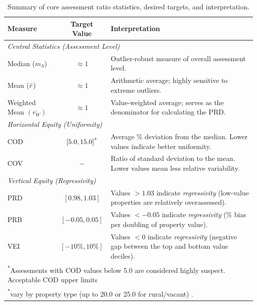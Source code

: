 \documentclass[12pt, draft]{article}
\theoremstyle{plain}
\theoremstyle{definition}
\newcommand{\1}{\mathbf{1}}
\begin{document}
\begin{table}[!ht]
\centering
\caption{Summary of core assessment ratio statistics, desired targets, and interpretation.}
\label{tab:assessment_metrics_summary}
\begin{tabular}{lcp{8.5cm}}
\toprule
\textbf{Measure} & \textbf{Target Value} & \textbf{Interpretation} \\
\midrule
\multicolumn{3}{l}{\textit{{Central Statistics (Assessment Level)}}} \vspace{3mm} \\
Median ($m_S$) & \(\approx 1\) & Outlier-robust measure of overall assessment level. \\
Mean ($\Bar r$) & \(\approx 1\) & Arithmetic average; highly sensitive to extreme outliers. \\
Weighted Mean $(\overline{r_W})$ & \(\approx 1\) & Value-weighted average; serves as the denominator for calculating the PRD. \\
\midrule
\multicolumn{3}{l}{\textit{{Horizontal Equity (Uniformity)}}} \vspace{3mm}\\
COD & \([5.0, 15.0]\textsuperscript{*}\) & Average \% deviation from the median. Lower values indicate better uniformity. \\
COV & $-$ & Ratio of standard deviation to the mean. Lower values mean less relative variability. \\
\midrule
\multicolumn{3}{l}{\textit{{Vertical Equity (Regressivity)}}} \vspace{3mm}\\
PRD & \([0.98, 1.03]\) &Values \(>1.03\) indicate \textit{regressivity} (low-value properties are relatively overassessed). \\
PRB & \([-0.05, 0.05]\) & Values \(<-0.05\) indicate \textit{regressivity} (\% bias per doubling of property value). \\
VEI & \([-10\%, 10\%]\) & Values \(<0\) indicate \textit{regressivity} (negative gap between the top and bottom value deciles). \\
\bottomrule
\multicolumn{3}{l}{\footnotesize \textsuperscript{*}Assessments with COD values below 5.0 are considered highly suspect. Acceptable COD upper limits} \\
\multicolumn{3}{l}{\footnotesize  {\color{white}\textsuperscript{*}}vary by property type (up to 20.0 or 25.0 for rural/vacant) \cite{IAAO2025ExposureRatio}. } \\
\end{tabular}
\end{table}
\end{document}
